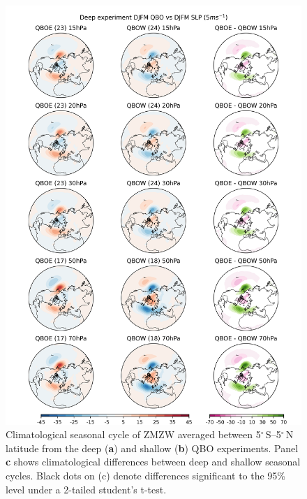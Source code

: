 \begin{figure}[h!]
\begin{center}
\noindent\includegraphics[width = \linewidth]{Figures/Figures-deepQBO/SLP_composites_QBO_phases_d_higher_DJFMQBO_vs_DJFM_70hPa_5thresh.png}
\caption[Climatological seasonal cycle of equatorial ZMZW in QBO experiments]{Climatological seasonal cycle of ZMZW averaged between 5$^{\circ}$\,S--5$^{\circ}$\,N latitude from the deep (\textbf{a}) and shallow (\textbf{b}) QBO experiments. Panel \textbf{c} shows climatological differences between deep and shallow seasonal cycles. Black dots on (c) denote differences significant to the 95\% level under a 2-tailed student's t-test.}
\label{fig:experiment_SAOs}
\end{center}
\end{figure}


